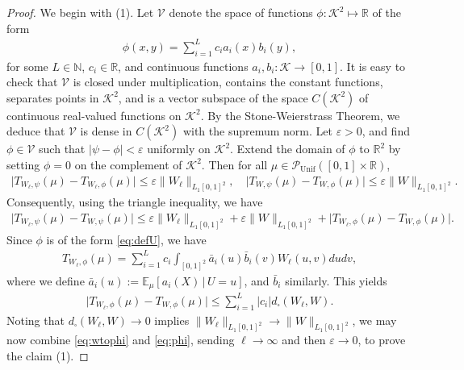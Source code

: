 \documentclass[11pt,reqno]{amsart}
\numberwithin{equation}{section}
\theoremstyle{definition}
\def\E{{\mathbb E}}
\def\R{{\mathbb R}}
\def\N{{\mathbb N}}
\def\P{{\mathcal P}}
\def\Punif{\P_{\mathrm{Unif}}([0,1] \times \R)}
\begin{document}
\begin{proof}
	We begin with (1). Let $\mathcal{V}$ denote the space of functions $\phi:\mathcal{K}^2\mapsto \R$ of the form
	\begin{align}\label{eq:defU}
		\phi(x,y)=\sum_{i=1}^L c_i a_i(x)b_i(y),
	\end{align}
	for some $L\in \N$, $c_i\in \R$, and continuous functions $a_i,b_i:\mathcal{K} \to [0,1]$. It is easy to check that $\mathcal{V}$ is closed under multiplication, contains the constant functions, separates points in $\mathcal{K}^2$, and is a vector subspace of the space $C(\mathcal{K}^2)$ of continuous real-valued functions on $\mathcal{K}^2$.
	By the Stone-Weierstrass Theorem, we deduce that $\mathcal{V}$ is dense in $C(\mathcal{K}^2)$ with the supremum norm. Let $\varepsilon>0$, and find $\phi\in \mathcal{V}$ such that  $|\psi-\phi| < \varepsilon$ uniformly on $\mathcal{K}^2$.
	Extend the domain of $ \phi $ to $\R^2$ by setting $ \phi = 0 $ on the complement of $\mathcal{K}^2$. 
	 Then for all $\mu \in \Punif$,
	\begin{align*}
		\big|T_{W_\ell,\psi}(\mu)-T_{W_\ell,\phi}(\mu)\big|\le \varepsilon  \|W_\ell\|_{L_1[0,1]^2}, \quad \big|T_{W,\psi}(\mu)-T_{W,\phi}(\mu)\big|\le \varepsilon \|W\|_{L_1[0,1]^2}.
	\end{align*}
	Consequently, using the  triangle inequality, we have
	\begin{align}\label{eq:wtophi}
		\big|T_{W_\ell,\psi}(\mu)-T_{W,\psi}(\mu)\big|\le \varepsilon \|W_\ell\|_{L_1[0,1]^2} + \varepsilon \|W\|_{L_1[0,1]^2}  +\big|T_{W_\ell,\phi}(\mu)-T_{W,\phi}(\mu)\big|.
	\end{align}
	Since $\phi$ is of the form \eqref{eq:defU}, we have
	\begin{align*}
		T_{W_\ell,\phi}(\mu)=\sum_{i=1}^L c_i \int_{[0,1]^2}\bar a_i(u)\bar b_i(v)W_\ell(u,v) dudv,
	\end{align*}
	where we define $\bar a_i(u) := \E_{\mu}[a_i(X)\,|\,U=u]$, and $\bar b_i$ similarly. This yields
	\begin{align}\label{eq:phi}
		\big| T_{W_\ell,\phi}(\mu)- T_{W,\phi}(\mu)\big|\le \sum_{i=1}^L|c_i| d_\square(W_\ell,W).
	\end{align}
	Noting that  $ d_\square(W_\ell, W) \to 0$ implies $ \|W_\ell\|_{L_1[0,1]^2}  \to \|W\|_{L_1[0,1]^2} $, we may now combine \eqref{eq:wtophi} and \eqref{eq:phi}, sending $\ell\to\infty$ and then $\varepsilon \to 0$, to prove the claim (1).
	

\end{proof}
\end{document}
